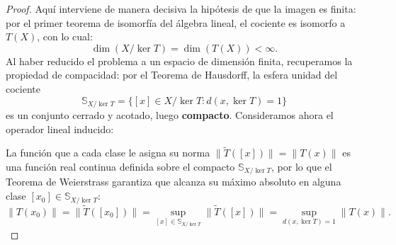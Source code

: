 \documentclass[12pt]{article}
\begin{document}
\begin{ejercicio}
\begin{proof}
            Aquí interviene de manera decisiva la hipótesis de que la imagen es finita: por el primer teorema de isomorfía del álgebra lineal, el cociente es isomorfo a $T(X)$, con lo cual:
            \begin{equation*}
                \dim(X/\ker T) = \dim(T(X)) < \infty.
            \end{equation*}
            Al haber reducido el problema a un espacio de dimensión finita, recuperamos la propiedad de compacidad: por el Teorema de Hausdorff, la esfera unidad del cociente
            \begin{equation*}
                \mathbb{S}_{X/\ker T} = \{ [x] \in X/\ker T : d(x, \ker T) = 1 \}
            \end{equation*}
            es un conjunto cerrado y acotado, luego \textbf{compacto}. Consideramos ahora el operador lineal inducido:
            
            La función que a cada clase le asigna su norma $\|\widetilde{T}([x])\| = \|T(x)\|$ es una función real continua definida sobre el compacto $\mathbb{S}_{X/\ker T}$, por lo que el Teorema de Weierstrass garantiza que alcanza su máximo absoluto en alguna clase $[x_0] \in \mathbb{S}_{X/\ker T}$:
            \begin{equation*}
                \|T(x_0)\| = \|\widetilde{T}([x_0])\| = \sup_{[x] \in \mathbb{S}_{X/\ker T}} \|\widetilde{T}([x])\| = \sup_{d(x, \ker T) = 1} \|T(x)\|.
            \end{equation*}


\end{proof}
\end{ejercicio}
\end{document}
